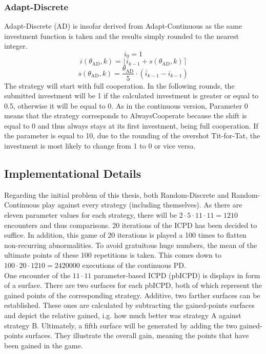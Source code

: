 \documentclass[11pt]{article}
\newcommand{\round}[1]{\ensuremath{\lfloor#1\rceil}}
\begin{document}
\subsubsection*{Adapt-Discrete}
Adapt-Discrete (AD) is insofar derived from Adapt-Continuous as the same investment function is taken and the results simply rounded to the nearest integer.
\begin{equation}
	i_0 = 1
	\label{eq:AD_i0}
\end{equation}
\begin{equation}
	i(\theta_{\mathrm{AD}}, k) = \round{i_{k-1} + s(\theta_{\mathrm{AD}}, k)}
	\label{eq:AD_i_eq}
\end{equation}
\begin{equation}
	s(\theta_{\mathrm{AD}}, k) = \frac{\theta_{\mathrm{AD}}}{5} \cdot (\bar i_{k-1} - i_{k-1})
	\label{eq:AD_s_eq}
\end{equation}
The strategy will start with full cooperation.
In the following rounds, the submitted investment will be 1 if the calculated investment is greater or equal to 0.5, otherwise it will be equal to 0.
As in the continuous version, Parameter 0 means that the strategy corresponds to AlwaysCooperate because the shift is equal to 0 and thus always stays at its first investment, being full cooperation.
If the parameter is equal to 10, due to the rounding of the overshot Tit-for-Tat, the investment is most likely to change from 1 to 0 or vice versa.

\subsection{Implementational Details} \label{sec:implementational_details}

Regarding the initial problem of this thesis, both Random-Discrete and Random-Continuous play against every strategy (including themselves).
As there are eleven parameter values for each strategy, there will be $2 \cdot 5 \cdot 11 \cdot 11 = 1210$ encounters and thus comparisons.
20 iterations of the ICPD has been decided to suffice.
In addition, this game of 20 iterations is played a 100 times to flatten non-recurring abnormalities.
To avoid gratuitous huge numbers, the mean of the ultimate points of these 100 repetitions is taken.
This comes down to $100 \cdot 20 \cdot 1210 = 2420000$ executions of the continuous PD.\\

One encounter of the $11 \cdot 11$ parameter-based ICPD (pbICPD) is displays in form of a surface.
There are two surfaces for each pbICPD, both of which represent the gained points of the corresponding strategy.
Additive, two farther surfaces can be established.
These ones are calculated by subtracting the gained-points surfaces and depict the relative gained, i.g. how much better was strategy A against strategy B.
Ultimately, a fifth surface will be generated by adding the two gained-points surfaces.
They illustrate the overall gain, meaning the points that have been gained in the game.
\end{document}
